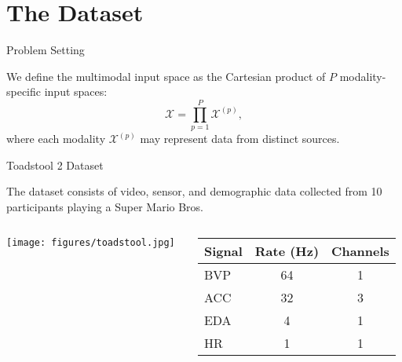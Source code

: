 \section{The Dataset}

\begin{frame}{Problem Setting}
	\begin{block}{}
		We define the multimodal input space as the Cartesian product of $P$ modality-specific input spaces:
		\[
		\mathcal{X} = \prod_{p=1}^{P} \mathcal{X}^{(p)},
		\]
		where each modality $\mathcal{X}^{(p)}$ may represent data from distinct sources.
	\end{block}
	
\end{frame}



\begin{frame}{Toadstool 2 Dataset}
\begin{block}{}
The dataset consists of video, sensor, and demographic data collected from 10 participants playing a Super Mario Bros.
\end{block}
		\begin{columns}[T] %
		\begin{column}{0.4\textwidth}
			\texttt{[image: figures/toadstool.jpg]}
			
		\end{column}
		\begin{column}{0.6\textwidth}

		\centering
		\small
		\begin{tabular}{lcc}
		\toprule
		\textbf{Signal} & \textbf{Rate (Hz)} & \textbf{Channels} \\
		\midrule
		BVP  & 64 & 1      \\
		ACC  & 32 & 3 		\\
		EDA  & 4  & 1      \\
		HR   & 1  & 1      \\
		\bottomrule
		\end{tabular}
		
		\begin{figure}[htbp]
			\centering
		\end{figure}


		\end{column}
	\end{columns}
\end{frame}


